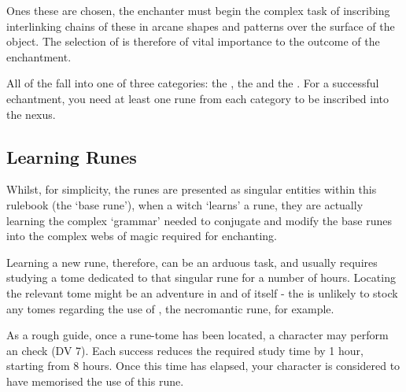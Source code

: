 Ones these  are chosen, the enchanter must begin the complex task of inscribing interlinking chains of these  in arcane shapes and patterns over the surface of the object.  The selection of  is therefore of vital importance to the outcome of the enchantment. 


All of the  fall into one of three categories: the , the  and the . For a successful echantment, you need at least one rune from each category to be inscribed into the nexus. 


\subsection{Learning Runes}

Whilst, for simplicity, the runes are presented as singular entities within this rulebook (the `base rune'), when a witch `learns' a rune, they are actually learning the complex `grammar' needed to conjugate and modify the base runes into the complex webs of magic required for enchanting. 

Learning a new rune, therefore, can be an arduous task, and usually requires studying a tome dedicated to that singular rune for a number of hours. Locating the relevant tome might be an adventure in and of itself - the  is unlikely to stock any tomes regarding the use of \rune{\lues}, the necromantic rune, for example.

As a rough guide, once a rune-tome has been located, a character may perform an  check (DV 7). Each success reduces the required study time by 1 hour, starting from 8 hours. Once this time has elapsed, your character is considered to have memorised the use of this rune. 
\newcommand\runeRow[3]
{
	\rune{#2}	&	#1	&		\small #3 \\
}
\newcommand\esoRow[3]
{
	\runeRow{#1}{#2}{Used to contain magic associated with the \key{#3} discipline.}
}

\newcommand\runeList[3]
{
	\subsection{#1}

	#2

	\begin{center}
		\begin{rndtable}{c l p {6 cm} }
			\bf Rune	&	\bf Name	&	\bf Description
			\\
			
			#3
		\end{rndtable}
	\end{center}
}






